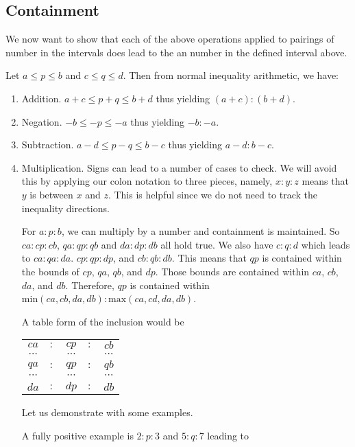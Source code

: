 \documentclass[12pt]{article}
\theoremstyle{remark}
\begin{document}
\subsection{Containment}\label{containment}

We now want to show that each of the above operations applied to pairings of number in the intervals  does lead to the an number in the defined interval above. 

Let $a \leq p \leq b$ and $c\leq  q \leq  d$. Then from normal inequality arithmetic, we have: 

\begin{enumerate}
    \item Addition.   $a +c \leq  p + q \leq  b +d$ thus yielding $(a+c):(b+d)$.
    \item Negation.  $-b \leq -p \leq -a$ thus yielding $-b:-a$.
    \item Subtraction.  $a - d \leq p-q \leq b -c$  thus yielding $a-d:b-c$.
    \item Multiplication. Signs can lead to a number of cases to check. We will avoid this by  applying our colon notation to three pieces, namely,  $x:y:z$ means that $y$ is between $x$ and $z$. This is helpful since we do not need to track the inequality directions. 
    
    For $a:p:b$, we can multiply by a number and containment is maintained. So $ca:cp:cb$, $qa: qp: qb$ and $da:dp:db$ all hold true. We also have $c:q:d$ which leads to $ca:qa:da$. $cp:qp:dp$, and $cb:qb:db$. This means that $qp$ is contained within the bounds of $cp$, $qa$, $qb$, and $dp$. Those bounds are contained within $ca$, $cb$, $da$, and $db$. Therefore, $qp$ is contained within $\mathrm{min}(ca, cb, da, db):\mathrm{max}(ca, cd, da, db)$. 
    
    A table form of the inclusion would be 
    
    \begin{tabular}{ccccc}
        $ca$ &$:$& $cp$ &$:$& $cb$ \\
        $\cdots$ & & $\cdots$ & & $\cdots$ \\
        $qa$ &$:$& $qp$ &$:$& $qb$\\
        $\cdots$ & & $\cdots$ & & $\cdots$ \\
         $da$ &$:$& $dp$&$:$& $db$
    \end{tabular}
    
    Let us demonstrate with some examples. 
    
    A fully positive example is $2:p:3$ and $5:q:7$ leading to 
    

\end{enumerate}
\end{document}
